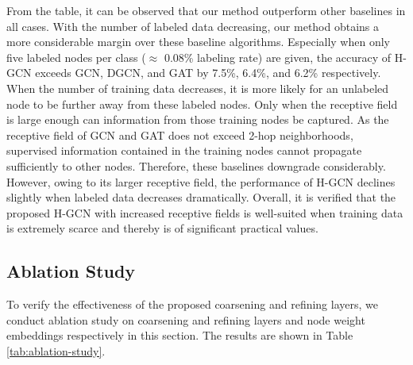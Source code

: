 \documentclass{article}
\begin{document}
From the table, it can be observed that our method outperform other baselines in all cases. With the number of labeled data decreasing, our method obtains a more considerable margin over these baseline algorithms. Especially when only five labeled nodes per class ($\approx$ 0.08\% labeling rate) are given, the accuracy of H-GCN exceeds GCN, DGCN, and GAT by 7.5\%, 6.4\%, and 6.2\% respectively. When the number of training data decreases, it is more likely for an unlabeled node to be further away from these labeled nodes. Only when the receptive field is large enough can information from those training nodes be captured. As the receptive field of GCN and GAT does not exceed 2-hop neighborhoods, supervised information contained in the training nodes cannot propagate sufficiently to other nodes. Therefore, these baselines downgrade considerably. However, owing to its larger receptive field, the performance of H-GCN declines slightly when labeled data decreases dramatically. Overall, it is verified that the proposed H-GCN with increased receptive fields is well-suited when training data is extremely scarce and thereby is of significant practical values.

\subsection{Ablation Study}
To verify the effectiveness of the proposed coarsening and refining layers, we conduct ablation study on coarsening and refining layers and node weight embeddings respectively in this section. The results are shown in Table \ref{tab:ablation-study}.

\begin{table}
	\centering
	\caption{Results of the ablation study}
	\label{tab:ablation-study}
\end{table}
\end{document}
